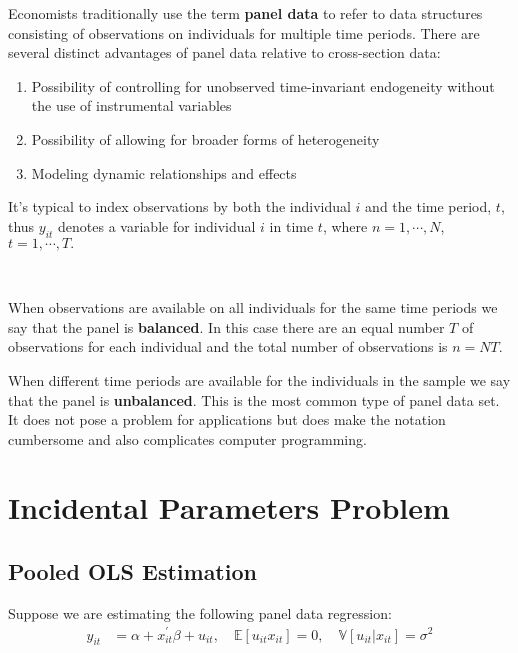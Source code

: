 Economists traditionally use the term \textbf{panel data} to refer to data structures consisting of observations on individuals 
for multiple time periods. 
There are several distinct advantages of panel data relative to cross-section data:
\begin{enumerate}
  \item Possibility of controlling for unobserved time-invariant endogeneity without the use of instrumental variables
  \item Possibility of allowing for broader forms of heterogeneity
  \item Modeling dynamic relationships and effects
\end{enumerate} 

It's typical to index observations by both the individual $i$ and the time period, $t$,
thus $y_{it} $ denotes a variable for individual $i$ in time $t$, where $n=1, \cdots, N$, $t=1, \cdots, T.$

\begin{definition}
  \

  When observations are available on all individuals for the same time periods we say that the panel is \textbf{balanced}. 
  In this case there are an equal number $T$ of observations for each individual and the total number of observations is $n = NT$.

  When different time periods are available for the individuals in the sample we say that the panel is \textbf{unbalanced}. 
  This is the most common type of panel data set. 
  It does not pose a problem for applications but does make the notation cumbersome and also complicates computer programming.
\end{definition}

\section{Incidental Parameters Problem}

\subsection{Pooled OLS Estimation}\label{sec:POLS}

Suppose we are estimating the following panel data regression:
\begin{align*}
  y_{it} &= \alpha +x_{it}^{\prime} \beta +u_{it}, \quad \mathbb{E}[u_{it} x_{it}] = 0, \quad \mathbb{V}[u_{it} | x_{it}] = \sigma^2
\end{align*}


